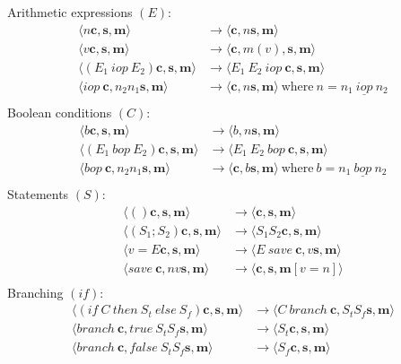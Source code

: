 \documentclass[11pt]{report}
\begin{document}
Arithmetic expressions $(E)$:
\begin{align*}
\langle n  \bm{c},  \bm{s},  \bm{m} \rangle  &\rightarrow   \langle  \bm{c}, n  \bm{s},  \bm{m} \rangle \\
\langle v  \bm{c},  \bm{s},  \bm{m} \rangle    &\rightarrow   \langle  \bm{c},  m(v),  \bm{s},  \bm{m} \rangle \\
\langle (E_1\ iop \ E_2)  \bm{c},  \bm{s},  \bm{m} \rangle    &\rightarrow   \langle E_1\  E_2\  iop  \ \bm{c},  \bm{s},  \bm{m} \rangle \\
\langle iop \ \bm{c}, n_2 n_1  \bm{s},  \bm{m} \rangle    &\rightarrow   \langle  \bm{c}, n  \bm{s},  \bm{m} \rangle  \ \text{where} \ n = n_1\ \underline{iop} \ n_2 \\
\end{align*}
Boolean conditions $(C)$:
\begin{align*}
\langle b  \bm{c},  \bm{s},  \bm{m} \rangle    &\rightarrow   \langle b, n  \bm{s},  \bm{m} \rangle \\
\langle (E_1 \ bop \ E_2)  \bm{c},  \bm{s},  \bm{m} \rangle    &\rightarrow   \langle E_1\ E_2\ bop \ \bm{c},  \bm{s},  \bm{m} \rangle \\
\langle bop \  \bm{c}, n_2 n_1  \bm{s},  \bm{m} \rangle    &\rightarrow   \langle  \bm{c}, b  \bm{s},  \bm{m} \rangle \  \text{where} \ b = n_1\ \underline{bop}\ n_2\\
\end{align*}
Statements $(S)$:
\begin{align*}
\langle ()  \bm{c},  \bm{s},  \bm{m} \rangle    &\rightarrow   \langle  \bm{c},  \bm{s},  \bm{m} \rangle \\
\langle (S_1 ; S_2)  \bm{c},  \bm{s},  \bm{m} \rangle    &\rightarrow   \langle S_1 S_2  \bm{c},  \bm{s},  \bm{m} \rangle \\
\langle v=E  \bm{c},  \bm{s},  \bm{m} \rangle    &\rightarrow   \langle E\ save\  \bm{c}, v  \bm{s},  \bm{m} \rangle \\
\langle save \  \bm{c}, n v  \bm{s},  \bm{m} \rangle    &\rightarrow   \langle  \bm{c},  \bm{s},  \bm{m}[v=n] \rangle \\
\end{align*}
Branching $(if)$:
\begin{align*}
\langle (if\ C\ then\ S_t\ else\ S_f)  \bm{c},  \bm{s},  \bm{m} \rangle    &\rightarrow   \langle C\ branch\  \bm{c}, S_t S_f  \bm{s},  \bm{m} \rangle \\
\langle branch\  \bm{c}, true\  S_t S_f  \bm{s},  \bm{m} \rangle    &\rightarrow   \langle S_t  \bm{c},  \bm{s},  \bm{m} \rangle \\
\langle branch\  \bm{c}, false\ S_t S_f  \bm{s},  \bm{m} \rangle    &\rightarrow   \langle S_f  \bm{c},  \bm{s},  \bm{m} \rangle \\
\end{align*}
\end{document}
